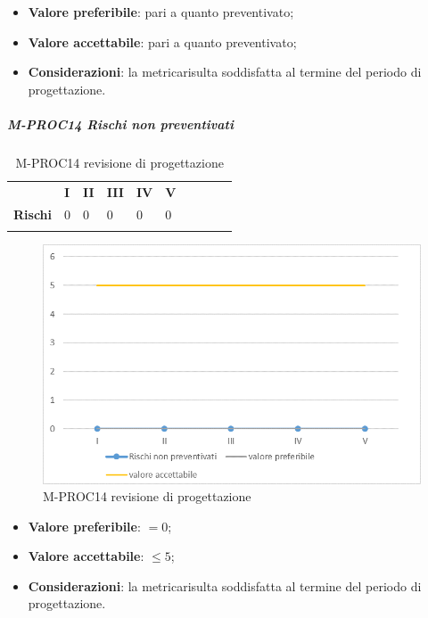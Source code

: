 \begin{itemize}
	\item \textbf{Valore preferibile}: pari a quanto preventivato;
	\item \textbf{Valore accettabile}: pari a quanto preventivato;
	\item \textbf{Considerazioni}: la metrica\glosp risulta soddisfatta al termine del periodo di progettazione\glo.
\end{itemize}
\subparagraph{M-PROC14 Rischi non preventivati} \mbox{}
\begin{longtable}[H!] {						
		>{}p{50mm}  		
		>{}p{8mm}
		>{}p{8mm}		
		>{}p{8mm}		
		>{}p{8mm}		
		>{}p{8mm}		
		>{}p{8mm}
		>{}p{8mm}
		>{}p{8mm}
		>{}p{8mm}
	}
	\rowcolor{gray!50}
	\textbf{} & \textbf{I} & \textbf{II} & \textbf{III} & \textbf{IV} & \textbf{V} \TBstrut \\ [2mm]
	\textbf{Rischi} & 0 & 0 & 0 & 0 & 0 \TBstrut \\ [2mm]
	\rowcolor{white}
	\caption{M-PROC14 revisione di progettazione\glo}
\end{longtable}
\begin{figure}[H] 	
	\includegraphics[width=\linewidth]{./img/grafici/RP11.png}	
	\caption{M-PROC14 revisione di progettazione\glo}	
\end{figure}
\begin{itemize}
	\item \textbf{Valore preferibile}: $=0$;
	\item \textbf{Valore accettabile}: $\le 5$;
	\item \textbf{Considerazioni}: la metrica\glosp risulta soddisfatta al termine del periodo di progettazione\glo.
\end{itemize}

